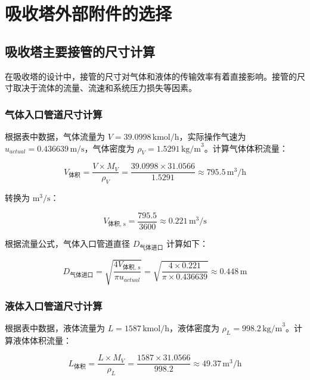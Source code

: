 \chapter{吸收塔外部附件的选择}

\section{吸收塔主要接管的尺寸计算}

在吸收塔的设计中，接管的尺寸对气体和液体的传输效率有着直接影响。接管的尺寸取决于流体的流量、流速和系统压力损失等因素。

\subsection{气体入口管道尺寸计算}
根据表中数据，气体流量为 $V = 39.0998 \, \text{kmol/h}$，实际操作气速为 $u_{actual} = 0.436639 \, \text{m/s}$，气体密度为 $\rho_V = 1.5291 \, \text{kg/m}^3$。计算气体体积流量：

\begin{equation}
	V_{\text{体积}} = \frac{V \times M_V}{\rho_V} = \frac{39.0998 \times 31.0566}{1.5291} \approx 795.5 \, \text{m}^3/\text{h}
\end{equation}

转换为 $\text{m}^3/\text{s}$：

\begin{equation}
	V_{\text{体积, s}} = \frac{795.5}{3600} \approx 0.221 \, \text{m}^3/\text{s}
\end{equation}

根据流量公式，气体入口管道直径 $D_{\text{气体进口}}$ 计算如下：

\begin{equation}
	D_{\text{气体进口}} = \sqrt{\frac{4 V_{\text{体积, s}}}{\pi u_{actual}}} = \sqrt{\frac{4 \times 0.221}{\pi \times 0.436639}} \approx 0.448 \, \text{m}
\end{equation}

\subsection{液体入口管道尺寸计算}
根据表中数据，液体流量为 $L = 1587 \, \text{kmol/h}$，液体密度为 $\rho_L = 998.2 \, \text{kg/m}^3$。计算液体体积流量：

\begin{equation}
	L_{\text{体积}} = \frac{L \times M_V}{\rho_L} = \frac{1587 \times 31.0566}{998.2} \approx 49.37 \, \text{m}^3/\text{h}
\end{equation}

